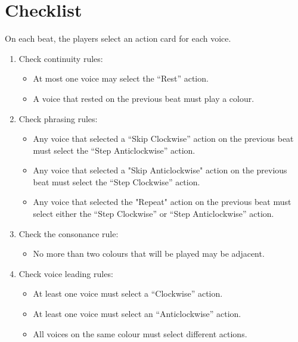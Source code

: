 \documentclass{scrartcl}
\numberwithin{example}{section}
\begin{document}
\begin{table}[p]
\begin{subtable}[y]{0.9\textwidth}
\begin{tabular}{@{}r c c c c c@{}}
\bottomrule
\end{tabular}
\end{subtable}
\end{table}

\newpage
\section{Checklist}
On each beat, the players select an action card for each voice.
\begin{enumerate}
  \item Check continuity rules:
  \begin{itemize}
    \item At most one voice may select the ``Rest'' action.
    \item A voice that rested on the previous beat must play a colour.
  \end{itemize}
  \item Check phrasing rules:
  \begin{itemize}
    \item Any voice that selected a ``Skip Clockwise'' action on the previous beat must select the ``Step Anticlockwise'' action.
    \item Any voice that selected a "Skip Anticlockwise" action on the previous beat must select the ``Step Clockwise'' action.
    \item Any voice that selected the "Repeat" action on the previous beat must select either
    the ``Step Clockwise'' or ``Step Anticlockwise'' action.
  \end{itemize}
  \item Check the consonance rule:
  \begin{itemize}
    \item No more than two colours that will be played may be adjacent.
  \end{itemize}
  \item Check voice leading rules:
  \begin{itemize}
    \item At least one voice must select a ``Clockwise'' action.
    \item At least one voice must select an ``Anticlockwise'' action.
    \item All voices on the same colour must select different actions.
  \end{itemize}
\end{enumerate}
\end{document}
